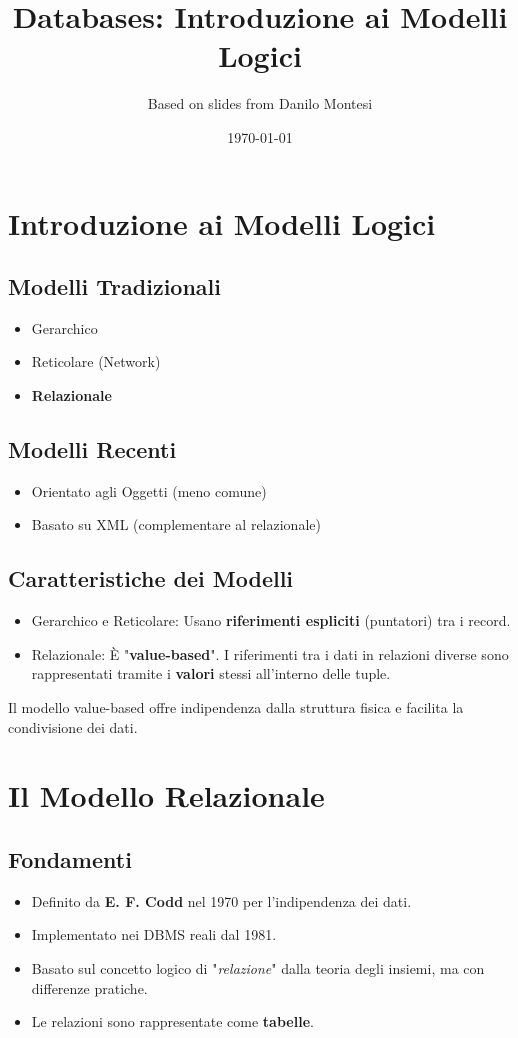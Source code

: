 \documentclass{article}
\title{Databases: Introduzione ai Modelli Logici}
\author{Based on slides from Danilo Montesi}
\date{\today}
\begin{document}
	
	\maketitle
	
	\section{Introduzione ai Modelli Logici}
	
	\subsection{Modelli Tradizionali}
	\begin{itemize}
		\item Gerarchico
		\item Reticolare (Network)
		\item \textbf{Relazionale}
	\end{itemize}
	
	\subsection{Modelli Recenti}
	\begin{itemize}
		\item Orientato agli Oggetti (meno comune)
		\item Basato su XML (complementare al relazionale)
	\end{itemize}
	
	\subsection{Caratteristiche dei Modelli}
	\begin{itemize}
		\item Gerarchico e Reticolare: Usano \textbf{riferimenti espliciti} (puntatori) tra i record.
		\item Relazionale: È "\textbf{value-based}". I riferimenti tra i dati in relazioni diverse sono rappresentati tramite i \textbf{valori} stessi all'interno delle tuple.
	\end{itemize}
	Il modello value-based offre indipendenza dalla struttura fisica e facilita la condivisione dei dati.
	
	\section{Il Modello Relazionale}
	
	\subsection{Fondamenti}
	\begin{itemize}
		\item Definito da \textbf{E. F. Codd} nel 1970 per l'indipendenza dei dati.
		\item Implementato nei DBMS reali dal 1981.
		\item Basato sul concetto logico di "\textit{relazione}" dalla teoria degli insiemi, ma con differenze pratiche.
		\item Le relazioni sono rappresentate come \textbf{tabelle}.
	\end{itemize}
	
\end{document}
